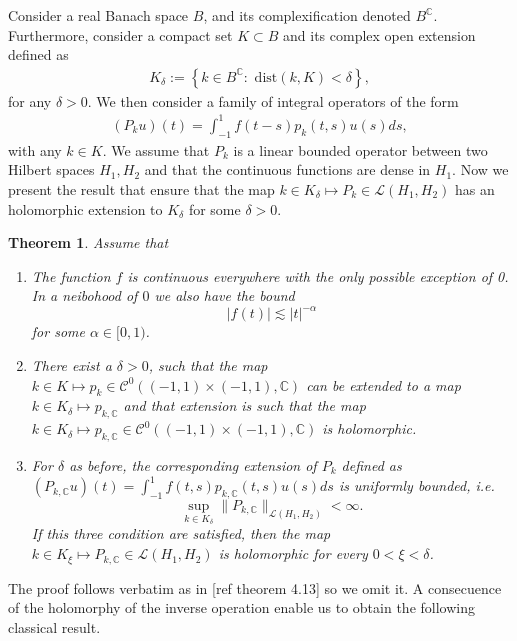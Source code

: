 \documentclass{article}
\newtheorem{theorem}{Theorem}[section]
\newcommand{\todo}[1]{{\color{red}[#1]}}
\newcommand{\IC}{{\mathbb C}}
\newcommand{\cmspace}[3]{\mathcal{C}^{#1} \left( #2, #3 \right)}
\begin{document}
Consider a real Banach space $B$, and its complexification denoted $B^{\IC}$. Furthermore, consider a compact set $K \subset B$ and its complex open extension defined as 
\begin{align}
\label{eq:openext}
K_\delta :=  \left\lbrace k \in B^{\IC} : \text{ dist}(k, K) < \delta \right\rbrace,
\end{align}
for any $\delta>0$. We then consider a family of integral operators of the form
\begin{align*}
(P_k u)(t) = \int_{-1}^{1} f(t-s) p_k(t,s) u(s) ds,
\end{align*}
with any $k \in K$. We assume that $P_k$ is a linear bounded operator between two Hilbert spaces $H_1,H_2$ and that the continuous functions are dense in $H_1$. Now we present the result that ensure that the map $k \in K_\delta \mapsto P_k \in \mathcal{L}(H_1,H_2)$ has an holomorphic extension to $K_\delta$ for some $\delta>0$. 

\begin{theorem} \label{thrm:abstractholm}
Assume that 
\begin{enumerate}
\item 
The function $f$ is continuous everywhere with the only possible  exception of 0. In a neibohood of $0$ we also have the bound 
$$|f(t)| \lesssim| t|^{-\alpha}$$
for some $\alpha \in [0,1)$. 
\item 
There exist a $\delta >0$, such that the map $k \in K \mapsto p_k \in \cmspace{0}{(-1,1)\times(-1,1)}{\IC}$ can be extended to a map $k \in K_\delta \mapsto p_{k,\IC}$ and that extension is such that 
the map $k \in K_\delta \mapsto p_{k,\IC } \in \cmspace{0}{(-1,1)\times(-1,1)}{\IC}$ is holomorphic. 
\item 
For $\delta$ as before, the corresponding extension of $P_k$ defined as $(P_{k,\IC}u)(t) = \int_{-1}^{1} f(t,s) p_{k,\IC}(t,s) u(s) ds$ is uniformly bounded, i.e. 
$$ \sup_{k \in K_\delta} \| P_{k,\IC} \|_{\mathcal{L}(H_1,H_2)}< \infty.$$
If this three condition are satisfied, then the map $k \in K_\xi \mapsto P_{k, \IC} \in \mathcal{L}(H_1,H_2)$ is holomorphic for every $0< \xi<\delta$.  
\end{enumerate}
\end{theorem}
The proof follows verbatim as in \todo{ref theorem 4.13} so we omit it. A consecuence of the holomorphy of the inverse operation enable us to obtain the following classical result.  
\end{document}
